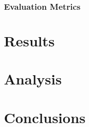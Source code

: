 \documentclass[11pt]{article}
\begin{document}
\subsubsection{Evaluation Metrics}

\section{Results}

\section{Analysis}


\section{Conclusions}



\end{document}
